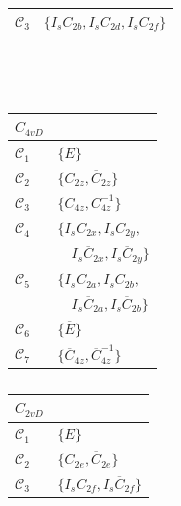 \begin{table}
\begin{subtable}[t]{0.32\linewidth}
\begin{tabular}[t]{|l|l|}
                $\mathcal{C}_{3}$ & $\{I_{s} C_{2 b}, I_{s} C_{2 d}, I_{s} C_{2 f}\}$\\
                \hline
            \end{tabular}
            \caption{}
            \label{table:C3v}
        \end{subtable}\\\\
        \begin{subtable}[t]{0.32\linewidth}
            \centering
            \begin{tabular}[t]{|l|l|}
                \hline
                $C_{4vD}$ & \\
                \hline
                $\mathcal{C}_{1}$ & $\{E\}$ \\
                $\mathcal{C}_{2}$ & $\{C_{2 z}, \overline{C}_{2 z}\}$ \\
                $\mathcal{C}_{3}$ & $\{C_{4 z}, C_{4 z}^{-1}\}$ \\
                $\mathcal{C}_{4}$ & $\{I_{s} C_{2 x}, I_{s} C_{2 y},$\\
                & $\quad I_{s} \overline{C}_{2 x}, I_{s} \overline{C}_{2 y}\}$ \\
                $\mathcal{C}_{5}$ & $\{I_{s} C_{2 a}, I_{s} C_{2 b},$\\
                & $\quad I_{s} \overline{C}_{2 a}, I_{s} \overline{C}_{2 b}\}$ \\
                $\mathcal{C}_{6}$ & $\{\overline{E}\}$ \\
                $\mathcal{C}_{7}$ & $\{\overline{C}_{4 z}, \overline{C}_{4 z}^{-1}\}$\\
                \hline
            \end{tabular}
            \caption{}
            \label{table:C4vD}
        \end{subtable}
        \begin{subtable}[t]{0.32\linewidth}
            \centering
            \begin{tabular}[t]{|l|l|}
                \hline
                $C_{2vD}$ & \\
                \hline
                $\mathcal{C}_{1}$ & $\{E\}$ \\
                $\mathcal{C}_{2}$ & $\{C_{2 e}, \overline{C}_{2 e}\}$ \\
                $\mathcal{C}_{3}$ & $\{I_{s} C_{2 f}, I_{s} \overline{C}_{2 f}\}$ \\

\end{tabular}
\end{subtable}
\end{table}

